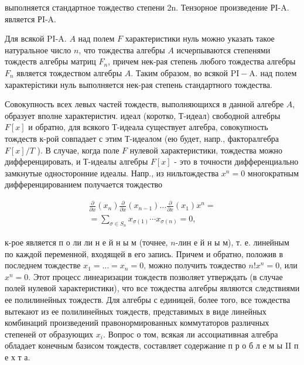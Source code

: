 \documentclass[10pt]{article}
\begin{document}
выполняется стандартное тождество степени 2n. Тензорное произведение РI-A. является РI-A.



Для всякой PI-A. $A$ над полем $F$ характеристики нуль можно указать такое натуральное число $n$, что тождества алгебры $A$ исчерпываются степенями тождеств алгебры матриц $F_{n}$, причем нек-рая степень любого тождества алгебры $F_{n}$ является тождеством алгебры $A$. Таким образом, во всякой $\mathrm{PI}-\mathrm{A}$. над полем характерістики нуль выполняется нек-рая степень стандартного тождества.



Совокупность всех левых частей тождеств, выполняющихся в данной алгебре $A$, образует вполне характеристич. идеал (коротко, Т-идеал) свободной алгебры $F[x]$ и обратно, для всякого Т-идеала существует алгебра, совокупность тождеств к-рой совпадает с этим Т-идеалом (ею будет, напр., факторалгебра $F[x] / T$ ). В случае, когда поле $F$ нулевой характеристики, тождества можно дифференцировать, и Т-идеалы алгебры $F[x]$ - это в точности дифференциально замкнутые односторонние идеалы. Напр., из нильтождества $x^{n}=0$ многократным дифференцированием получается тождество



\[

\begin{gathered}

\frac{\partial}{\partial x}\left(x_{n}\right) \frac{\partial}{\partial x}\left(x_{n-1}\right) \ldots \frac{\partial}{\partial x}\left(x_{1}\right) x^{n}= \\

=\sum_{\sigma \in S_{n}} x_{\sigma(1)} \cdots x_{\sigma(n)}=0,

\end{gathered}

\]



к-рое является п о ли ли н е й н ы м (точнее, $n$-лин е й н ы м), т. е. линейным по каждой переменной, входящей в его запись. Причем и обратно, положив в последнем тождестве $x_{1}=\ldots=x_{n}=0$, можно получить тождество $n ! x^{n}=0$, или $x^{n}=0$. Этот процесс линеаризации тождеств позволяет утверждать (в случае полей нулевой характеристики), что все тождества алгебры являются следствиями ее полилинейных тождеств. Для алгебры с единицей, более того, все тождества вытекают из ее полилинейных тождеств, представимых в виде линейных комбинаций произведений правонормированных коммутаторов различных степеней от образующих $x_{i}$. Вопрос о том, всякая ли ассоциативная алгебра обладает конечным базисом тождеств, составляет содержание п р о б л е м ы II п е х т а.
\end{document}
